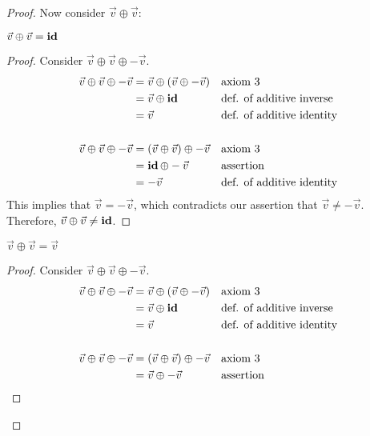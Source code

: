 \begin{proof}
  Now consider $\vec{v} \oplus \vec{v}$:
  \begin{enumerate}
     $\vec{v} \oplus \vec{v} = \operatorname{\textbf{id}}$
    \begin{proof}
      Consider $\vec{v} \oplus \vec{v} \oplus -\vec{v}$.
      \begin{align*}
        \vec{v} \oplus \vec{v} \oplus -\vec{v} & = \vec{v} \oplus (\vec{v} \oplus -\vec{v}) &  & \text{axiom 3}                   \\
                                               & = \vec{v} \oplus \operatorname{\textbf{id}}                       &  & \text{def. of additive inverse}  \\
                                               & = \vec{v}                                  &  & \text{def. of additive identity} \\ \\
        \vec{v} \oplus \vec{v} \oplus -\vec{v} & = (\vec{v} \oplus \vec{v}) \oplus -\vec{v} &  & \text{axiom 3}                   \\
                                               & = \operatorname{\textbf{id}} \oplus -\vec{v}                      &  & \text{assertion}                 \\
                                               & = -\vec{v}                                 &  & \text{def. of additive identity}
      \end{align*}
      This implies that $\vec{v} = -\vec{v}$, which contradicts our assertion that $\vec{v} \neq -\vec{v}$. Therefore, $\vec{v} \oplus \vec{v} \neq \operatorname{\textbf{id}}$.
    \end{proof}
     $\vec{v} \oplus \vec{v} = \vec{v}$
    \begin{proof}
      Consider $\vec{v} \oplus \vec{v} \oplus -\vec{v}$.
      \begin{align*}
        \vec{v} \oplus \vec{v} \oplus -\vec{v} & = \vec{v} \oplus (\vec{v} \oplus -\vec{v}) &  & \text{axiom 3}                   \\
                                               & = \vec{v} \oplus \id                       &  & \text{def. of additive inverse}  \\
                                               & = \vec{v}                                  &  & \text{def. of additive identity} \\ \\
        \vec{v} \oplus \vec{v} \oplus -\vec{v} & = (\vec{v} \oplus \vec{v}) \oplus -\vec{v} &  & \text{axiom 3}                   \\
                                               & = \vec{v} \oplus -\vec{v}                  &  & \text{assertion}                 \\

\end{align*}
\end{proof}
\end{enumerate}
\end{proof}
